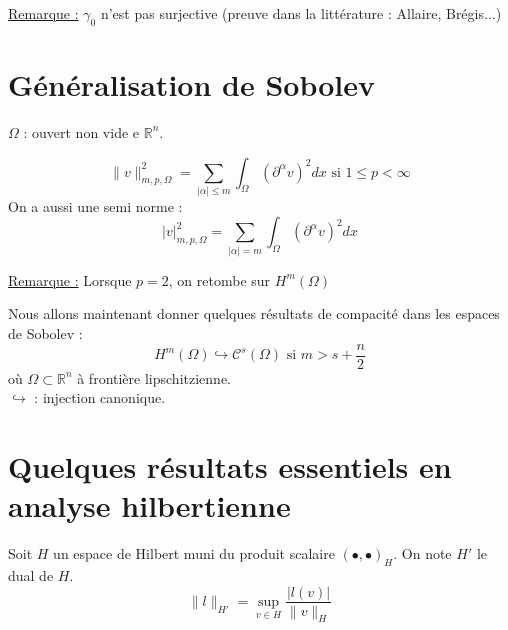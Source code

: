 \bigskip
\underline{Remarque :} $\gamma_0$ n'est pas surjective (preuve dans la littérature : Allaire, Brégis...)

\section{Généralisation de Sobolev}
$\Omega$ : ouvert non vide e $\mathbb{R}^n$.


\[\|v\|^2_{m,p,\Omega} = \sum_{|\alpha|\leq m} \int_\Omega (\partial^\alpha v)^2 dx \text{ si } 1\leq p < \infty\]
On a aussi une semi norme :
\[|v|^2_{m,p,\Omega} = \sum_{|\alpha|=m} \int_\Omega (\partial^\alpha v)^2 dx \]

\bigskip
\underline{Remarque :} Lorsque $p=2$, on retombe sur $H^m(\Omega)$


Nous allons maintenant donner quelques résultats de compacité dans les espaces de Sobolev :
\[H^m(\Omega) \hookrightarrow \mathcal{C}^s(\Omega) \text{ si } m> s+\frac{n}{2}\]
où $\Omega\subset \mathbb{R}^n$ à frontière lipschitzienne.\\
$\hookrightarrow$ : injection canonique.

\section{Quelques résultats essentiels en analyse hilbertienne}
Soit $H$ un espace de Hilbert muni du produit scalaire $(\bullet, \bullet)_H$. On note $H'$ le dual de $H$.
	\[\|l\|_{H'} = \sup_{v\in H} \frac{|l(v)|}{\|v\|_H}\]


